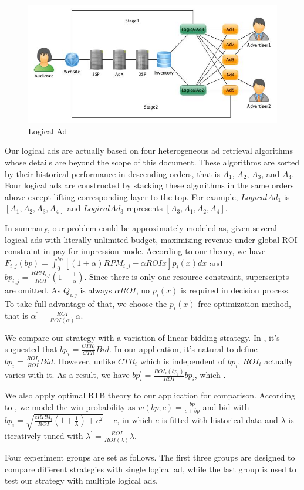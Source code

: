 \documentclass{article}
\theoremstyle{definition}
\newcommand{\sbp}{bp_{i,j}}
\newcommand{\sRPM}{RPM_{i,j}}
\newcommand{\sF}{F_{i,j}}
\newcommand{\ortbbp}{\sqrt{\frac{cRPM_i}{ROI}(1+\frac{1}{\lambda})+c^2}-c}
\newcommand{\dbbp}{\frac{\sRPM}{ROI}(1+\frac{1}{\alpha})}
\newcommand{\liniter}{bp_i^{'}=\frac{ROI_i(bp_i)}{ROI}bp_i}
\newcommand{\ortbiter}{\lambda^{'}=\frac{ROI}{ROI(\lambda)}\lambda}
\newcommand{\dbiter}{\alpha^{'} = \frac{ROI}{ROI(\alpha)}\alpha}
\begin{document}
\begin{CJK}{UTF8}{gbsn}
\begin{figure}[!h]
\centering
\includegraphics[width=0.6\linewidth]{./LogicalAd.jpg}
\caption{Logical Ad}
\end{figure}

Our logical ads are actually based on four heterogeneous ad retrieval algorithms whose details are beyond the scope of this document.
These algorithms are sorted by their historical performance in descending orders, that is $A_1$, $A_2$, $A_3$, and $A_4$.
Four logical ads are constructed by stacking these algorithms in the same orders above except lifting corresponding layer to the top.
For example, $LogicalAd_1$ is $[A_1, A_2, A_3, A_4]$ and $LogicalAd_3$ represents $[A_3, A_1, A_2, A_4]$.

In summary, our problem could be approximately modeled as, given several logical ads with literally unlimited budget,
    maximizing revenue under global ROI constraint in pay-for-impression mode.
According to our theory, we have $\sF(bp) = \int_0^{bp} [(1+\alpha)\sRPM - \alpha{}ROIx]p_i(x)dx$
    and $\sbp=\dbbp$.
Since there is only one resource constraint, superscripts are omitted.
As $Q_{i,j}$ is always $\alpha{}ROI$, no $p_i(x)$ is required in decision process.
To take full advantage of that, we choose the $p_i(x)$ free optimization method,
    that is $\dbiter$.

We compare our strategy with a variation of linear bidding strategy.
In \cite{M6D}, it's suguested that $bp_i=\frac{CTR_i}{CTR}Bid$.
In our application, it's natural to define $bp_i=\frac{ROI_i}{ROI}Bid$.
However, unlike $CTR_i$ which is independent of $bp_i$, $ROI_i$ actually varies with it.
As a result, we have $\liniter$,
    which .

We also apply optimal RTB theory to our application for comparison.
According to \cite{WeinanZhang2014}, we model the win probability as $w(bp;c)=\frac{bp}{c+bp}$
    and bid with $bp_i=\ortbbp$,
    in which $c$ is fitted with historical data
    and $\lambda$ is iteratively tuned with $\ortbiter$.

Four experiment groups are set as follows.
The first three groups are designed to compare different strategies with single logical ad,
    while the last group is used to test our strategy with multiple logical ads.


\end{CJK}
\end{document}
